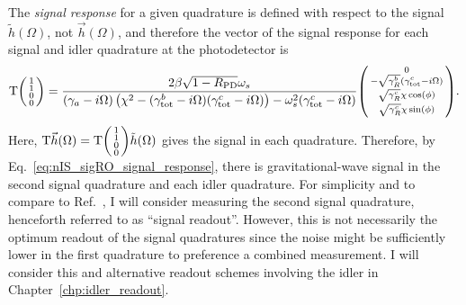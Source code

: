 The \emph{signal response} for a given quadrature is defined with respect to the signal $\tilde h(\Omega)$, not $\vec h(\Omega)$, and therefore the vector of the signal response for each signal and idler quadrature at the photodetector is
\begin{equation}\label{eq:nIS_sigRO_signal_response}
\text{T}\begin{psmallmatrix}1 \\1\\0\\0\end{psmallmatrix} = \frac{2 \beta \sqrt{1-R_\text{PD}} \omega_s}{(\gamma_a-i \Omega ) \left(\chi ^2-(\gamma^b_\text{tot}-i\Omega) (\gamma^c_\text{tot}-i\Omega)\right)-\omega_s^2 (\gamma^c_\text{tot}-i \Omega )} \begin{psmallmatrix}0 \\-\sqrt{\gamma^b_R}(\gamma^c_\text{tot}-i\Omega)\\\sqrt{\gamma^c_R}\chi\cos(\phi)\\\sqrt{\gamma^c_R}\chi\sin(\phi)\end{psmallmatrix}.
\end{equation}
Here, $\text{T}\vec h(\Omega)=\text{T}\begin{psmallmatrix}1 \\1\\0\\0\end{psmallmatrix}\tilde h(\Omega)$ gives the signal in each quadrature.
Therefore, by Eq.~\ref{eq:nIS_sigRO_signal_response}, there is gravitational-wave signal in the second signal quadrature and each idler quadrature. For simplicity and to compare to Ref.~\cite{liBroadbandSensitivityImprovement2020}, I will consider measuring the second signal quadrature, henceforth referred to as ``signal readout''. However, this is not necessarily the optimum readout of the signal quadratures since the noise might be sufficiently lower in the first quadrature to preference a combined measurement. I will consider this and alternative readout schemes involving the idler in Chapter~\ref{chp:idler_readout}.

